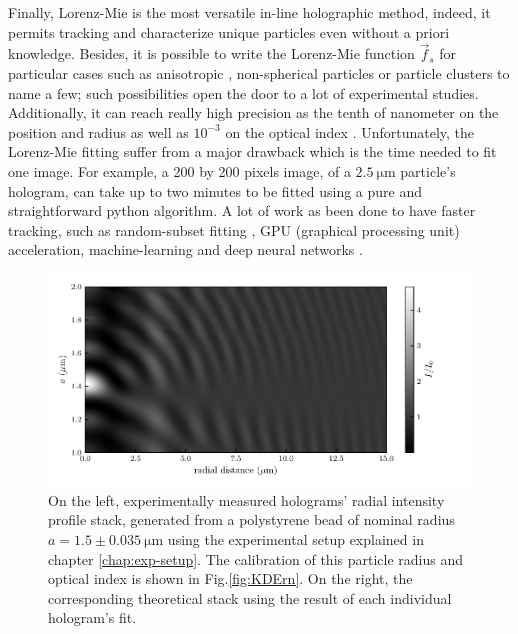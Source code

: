 Finally, Lorenz-Mie is the most versatile in-line holographic method, indeed, it permits tracking and characterize unique particles even without a priori knowledge. Besides, it is possible to write the Lorenz-Mie function $\vec{f}_s$ for particular cases such as anisotropic \cite{fung_holographic_2013}, non-spherical particles \cite{wang_using_2014} or particle clusters \cite{fung_holographic_2013, perry_real-space_2013} to name a few; such possibilities open the door to a lot of experimental studies. Additionally, it can reach really high precision as the tenth of nanometer on the position and radius as well as $10^{-3}$ on the optical index \cite{lee_characterizing_2007}. Unfortunately, the Lorenz-Mie fitting suffer from a major drawback which is the time needed to fit one image. For example, a 200 by 200 pixels image, of a $2.5 ~ \mathrm{\mu m}$ particle's hologram, can take up to two minutes to be fitted using a pure and straightforward python algorithm. A lot of work as been done to have faster tracking, such as random-subset fitting \cite{dimiduk_random-subset_2014}, GPU (graphical processing unit) acceleration, machine-learning \cite{yevick_machine-learning_2014, hannel_machine-learning_2018} and deep neural networks \cite{altman_catch_2020}.



\begin{figure}
	\centering
	\includegraphics{02_body/chapter2/images/holo_size_exemple/holos_only_n.pdf}
	\caption{On the left, experimentally measured  holograms' radial intensity profile stack, generated from a polystyrene bead of nominal radius $a = 1.5 \pm 0.035 ~ \mathrm{\mu m} $ using the experimental setup explained in chapter \ref{chap:exp-setup}. The calibration of this particle radius and optical index is shown in Fig.\ref{fig:KDErn}. On the right, the corresponding theoretical stack using the result of each individual hologram's fit.}
	\label{fig:holo_onlyn}
\end{figure}




